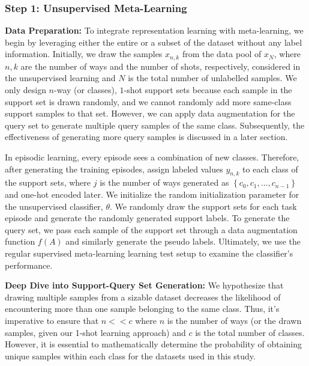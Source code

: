 \subsubsection{Step 1: Unsupervised Meta-Learning}

\textbf{Data Preparation:} To integrate representation learning with meta-learning, we begin by leveraging either the entire or a subset of the dataset without any label information. Initially, we draw the samples \(x_{n,k}\) from the data pool of \(x_{N}\), where \(n, k\) are the number of ways and the number of shots, respectively, considered in the unsupervised learning and \(N\) is the total number of unlabelled samples. We only design \(n\)-way (or classes), \(1\)-shot support sets because each sample in the support set is drawn randomly, and we cannot randomly add more same-class support samples to that set. However, we can apply data augmentation for the query set to generate multiple query samples of the same class. Subsequently, the effectiveness of generating more query samples is discussed in a later section. 

In episodic learning, every episode sees a combination of new classes. Therefore, after generating the training episodes, assign labeled values \(y_{n,k}\) to each class of the support sets, where \(j\) is the number of ways generated as $\left \{ c_{0},c_{1},...,c_{n-1} \right \}$ and one-hot encoded later. We initialize the random initialization parameter for the unsupervised classifier, $\theta$. We randomly draw the support sets for each task episode and generate the randomly generated support labels. To generate the query set, we pass each sample of the support set through a data augmentation function \(f(A)\) and similarly generate the pseudo labels. Ultimately, we use the regular supervised meta-learning learning test setup to examine the classifier's performance.

\textbf{Deep Dive into Support-Query Set Generation:} We hypothesize that drawing multiple samples from a sizable dataset decreases the likelihood of encountering more than one sample belonging to the same class. Thus, it's imperative to ensure that \(n<<c\) where \(n\) is the number of ways (or the drawn samples, given our 1-shot learning approach) and \(c\) is the total number of classes. However, it is essential to mathematically determine the probability of obtaining unique samples within each class for the datasets used in this study. 

